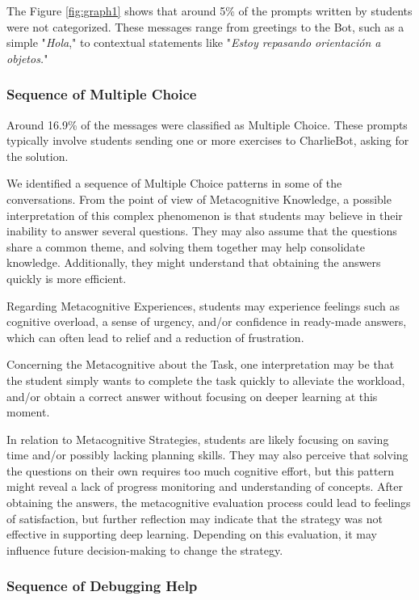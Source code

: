 \documentclass[a4paper,twoside]{article}
\begin{document}

The Figure \ref{fig:graph1} shows that around 5\% of the prompts
written by students were not categorized. These messages range from
greetings to the Bot, such as a simple "\textit{Hola}," to
contextual statements like "\textit{Estoy repasando orientación a
objetos.}"

\subsubsection*{Sequence of Multiple Choice}

Around 16.9\% of the messages were classified as Multiple Choice. These prompts
typically involve students sending one or more exercises to CharlieBot, asking
for the solution.

We identified a sequence of Multiple Choice patterns in some of the
conversations. From the point of view of Metacognitive Knowledge, a possible
interpretation of this complex phenomenon is that students may believe in their
inability to answer several questions. They may also assume that the questions
share a common theme, and solving them together may help consolidate knowledge.
Additionally, they might understand that obtaining the answers quickly is more
efficient.

Regarding Metacognitive Experiences, students may experience feelings such as
cognitive overload, a sense of urgency, and/or confidence in ready-made answers,
which can often lead to relief and a reduction of frustration.

Concerning the Metacognitive about the Task, one interpretation may be that the
student simply wants to complete the task quickly to alleviate the workload,
and/or obtain a correct answer without focusing on deeper learning at
this moment.

In relation to Metacognitive Strategies, students are likely focusing on saving
time and/or possibly lacking planning skills. They may also perceive that
solving the questions on their own requires too much cognitive effort, but this
pattern might reveal a lack of progress monitoring and understanding of
concepts. After obtaining the answers, the metacognitive evaluation process
could lead to feelings of satisfaction, but further reflection may indicate that
the strategy was not effective in supporting deep learning. Depending on this
evaluation, it may influence future decision-making to change the strategy.

\subsubsection*{Sequence of Debugging Help}
\end{document}
